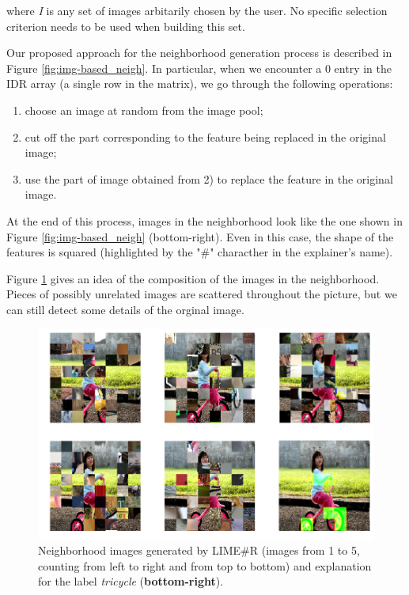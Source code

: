 \documentclass[12pt, twoside, a4paper]{report}
\begin{document}
where \textit{I} is any set of images arbitarily chosen by the user. No specific selection criterion needs to be used when building this set.

Our proposed approach for the neighborhood generation process is described in Figure \ref{fig:img-based_neigh}. In particular, when we encounter a 0 entry in the IDR array (a single row in the matrix), we go through the following operations:

\begin{enumerate}
\item choose an image at random from the image pool;
\item cut off the part corresponding to the feature being replaced in the original image;
\item use the part of image obtained from 2) to replace the feature in the original image.
\end{enumerate}

At the end of this process, images in the neighborhood look like the one shown in Figure \ref{fig:img-based_neigh} (bottom-right). Even in this case, the shape of the features is squared (highlighted by the "\#" characther in the explainer's name).

Figure \ref{fig:limesharpR_neigh} gives an idea of the composition of the images in the neighborhood. Pieces of possibly unrelated images are scattered throughout the picture, but we can still detect some details of the orginal image.

\begin{figure}
\begin{center}
\includegraphics[width=.85\textwidth]{images/limesharpR_neighborhood.png} 
\caption{Neighborhood images generated by LIME\#R (images from 1 to 5, counting from left to right and from top to bottom) and explanation for the label \textit{tricycle} (\textbf{bottom-right}).}
\label{fig:limesharpR_neigh}
\end{center}
\end{figure}
\end{document}

